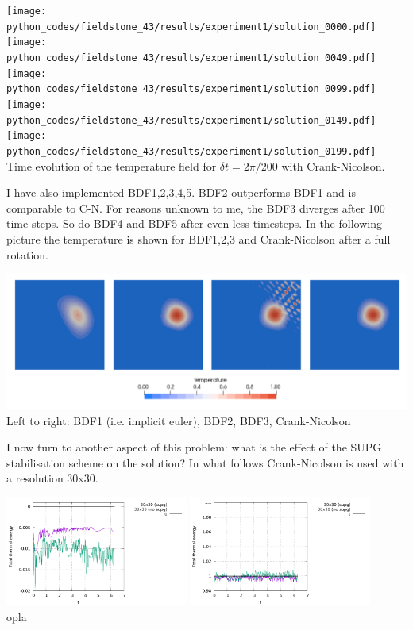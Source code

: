 \begin{center}
\texttt{[image: python\_codes/fieldstone\_43/results/experiment1/solution\_0000.pdf]}
\texttt{[image: python\_codes/fieldstone\_43/results/experiment1/solution\_0049.pdf]}
\texttt{[image: python\_codes/fieldstone\_43/results/experiment1/solution\_0099.pdf]}
\texttt{[image: python\_codes/fieldstone\_43/results/experiment1/solution\_0149.pdf]}
\texttt{[image: python\_codes/fieldstone\_43/results/experiment1/solution\_0199.pdf]}\\
{\small Time evolution of the temperature field for $\delta t=2\pi/200$ with Crank-Nicolson.}
\end{center}

I have also implemented BDF1,2,3,4,5. BDF2 outperforms BDF1 and is comparable to C-N. 
For reasons unknown to me, the BDF3 diverges after 100 time steps. So do 
BDF4 and BDF5 after even less timesteps. In the following picture the temperature is shown for 
BDF1,2,3 and Crank-Nicolson after a full rotation.

\begin{center}
\includegraphics[width=15cm]{python_codes/fieldstone_43/results/experiment1/Tbdf123crni.png}\\
{\captionfont Left to right: BDF1 (i.e. implicit euler), BDF2, BDF3, Crank-Nicolson}
\end{center}

I now turn to another aspect of this problem: what is the effect of the SUPG stabilisation 
scheme on the solution? In what follows Crank-Nicolson is used with a resolution 30x30.

\begin{center}
\includegraphics[width=6cm]{python_codes/fieldstone_43/results/experiment1/Tmin_supg}
\includegraphics[width=6cm]{python_codes/fieldstone_43/results/experiment1/Tmax_supg}\\
{\captionfont opla} 
\end{center}

